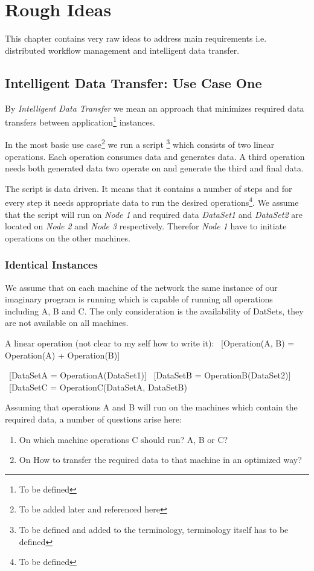 \chapter{Rough Ideas}

This chapter contains very raw ideas to address main requirements i.e.
distributed workflow management and intelligent data transfer.

\section{Intelligent Data Transfer: Use Case One}
By \textit{Intelligent Data Transfer} we mean an approach that
minimizes required data transfers between application\footnote{To be defined}
instances.

In the most basic use case\footnote{To be added later and 
referenced here} we run a script
\footnote{To be defined and added to
the terminology, terminology itself has to be defined}
which consists of two linear operations. Each operation consumes data
and generates data. A third operation needs both generated data two 
operate on and generate the third and final data.

The script is data driven. It means that it contains a number
of steps and for every step it needs appropriate data to run the
desired operations\footnote{To be defined}. We assume that
the script will run on \textit{Node 1} and required data 
\textit{DataSet1} and \textit{DataSet2} are 
located on \textit{Node 2}
and \textit{Node 3} respectively. Therefor \textit{Node 1} have
to initiate operations on the other machines.

\subsection{Identical Instances}
We assume that on each machine of the network the same instance of our
imaginary program is running which is capable of running all operations
including A, B and C. The only consideration is the availability of 
DatSets, they are not available on all machines.

A linear operation (not clear to my self how to write it):
\ [Operation(A, B) = Operation(A) + Operation(B)]

\ [DataSetA = OperationA(DataSet1)]
\ [DataSetB = OperationB(DataSet2)]
\ [DataSetC = OperationC(DataSetA, DataSetB)

Assuming that operations A and B will run on the machines which
contain the required data, a number of questions arise here:
\begin{enumerate}
\item On which machine operations C should run? A, B or C?
\item On How to transfer the required data to that machine in an 
optimized way?
\end{enumerate}

